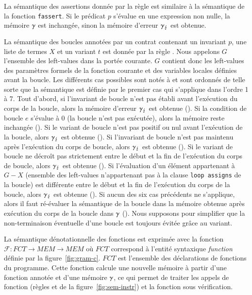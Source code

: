 La sémantique des assertions \eacsl donnée par la règle  est
similaire à la sémantique de la fonction \lstinline'fassert'.
Si le prédicat $p$ s'évalue en une expression non nulle,
la mémoire $\gamma$ est inchangée, sinon la mémoire d'erreur $\gamma_\lightning$ est
obtenue.

La sémantique des boucles annotées par un contrat contenant un invariant
$p$, une liste de termes $X$ et un variant $t$ est
donnée par la règle .
Nous appelons $G$ l'ensemble des left-values dans la portée courante.
$G$ contient donc les left-values des paramètres formels de la fonction
courante et des variables locales définies avant la boucle.
Les différents cas possibles sont notés  à
 et sont ordonnés de telle sorte que la sémantique est
définie par le premier cas qui s'applique dans l'ordre 1 à 7.
Tout d'abord, si l'invariant de boucle n'est pas établi avant l'exécution du
corps de la boucle, alors la mémoire d'erreur $\gamma_\lightning$ est obtenue
().
Si la condition de boucle $e$ s'évalue à $0$ (la boucle n'est pas exécutée),
alors la mémoire reste inchangée ().
Si le variant de boucle n'est pas positif ou nul avant l'exécution de la boucle,
alors $\gamma_\lightning$ est obtenue ().
Si l'invariant de boucle n'est pas maintenu après l'exécution du corps de
boucle, alors $\gamma_\lightning$ est obtenue ().
Si le variant de boucle ne décroît pas strictement entre le début et la fin de
l'exécution du corps de boucle, alors $\gamma_\lightning$ est obtenue
().
Si l'évaluation d'un élément appartenant à $G-X$ (ensemble des left-values
n'appartenant pas à la clause \lstinline'loop assigns' de la boucle) est
différente entre le début et la fin de l'exécution du corps de la boucle, alors
$\gamma_\lightning$ est obtenue ().
Si aucun des six cas précédents ne s'applique, alors il faut ré-évaluer la
sémantique de la boucle dans la mémoire obtenue après exécution du corps de la
boucle dans $\gamma$ ().
Nous supposons pour simplifier que la non-terminaison éventuelle d'une boucle
est toujours évitée grâce au variant.





La sémantique dénotationnelle des fonctions est exprimée avec la fonction
$\mathcal{F} : FCT \rightarrow MEM \rightarrow MEM$ où $FCT$ correspond à
l'entité syntaxique \textit{function} définie par la figure~\ref{fig:gram-c}.
$FCT$ est l'ensemble des déclarations de fonctions du programme.
Cette fonction calcule une nouvelle mémoire à partir d'une fonction annotée et
d'une mémoire $\gamma$, ce qui permet de traiter les appels de fonction (règles
 et  de la figure~\ref{fig:sem-instr}) et la
fonction sous vérification.


